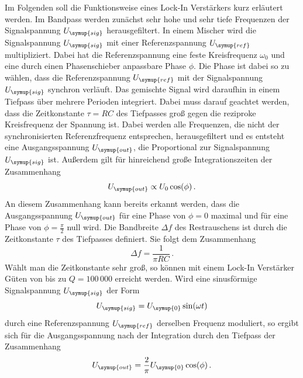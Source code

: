 Im Folgenden soll die Funktionsweise eines Lock-In Verstärkers kurz erläutert
werden. Im Bandpass werden zunächst sehr hohe und sehr tiefe Frequenzen der
Signalspannung $U_{\symup{sig}}$ herausgefiltert. In einem Mischer wird die
Signalspannung $U_{\symup{sig}}$ mit einer Referenzspannung $U_{\symup{ref}}$
multipliziert. Dabei hat die Referenzspannung eine feste Kreisfrequenz
$\omega_0$ und eine durch einen Phasenschieber anpassbare Phase $\phi$. Die Phase
ist dabei so zu wählen, dass die Referenzspannung $U_{\symup{ref}}$ mit der
Signalspannung $U_{\symup{sig}}$ synchron verläuft. Das gemischte Signal wird
daraufhin in einem Tiefpass über mehrere Perioden integriert. Dabei muss darauf
geachtet werden, dass  die Zeitkonstante $\tau=RC$ des Tiefpasses groß gegen die
reziproke Kreisfrequenz der Spannung ist. Dabei werden alle Frequenzen, die nicht
der synchronisierten Referenzfrequenz entsprechen, herausgefiltert und es entsteht
eine Ausgangsspannung $U_{\symup{out}}$, die Proportional zur Signalspannung
$U_{\symup{sig}}$ ist. Außerdem gilt für hinreichend große Integrationszeiten
der Zusammenhang
\begin{equation}
  U_{\symup{out}}\propto U_0 \cos(\phi) \,.
  \label{eqn:U_out_prop}
\end{equation}
An diesem Zusammenhang kann bereits erkannt werden, dass die Ausgangsspannung
$U_{\symup{out}}$ für eine Phase von $\phi=0$ maximal und für eine Phase von
$\phi=\frac{\pi}{2}$ null wird.
Die Bandbreite $\Delta f$ des Restrauschens ist durch die Zeitkonstante $\tau$ des Tiefpasses
definiert. Sie folgt dem Zusammenhang
\begin{equation}
  \Delta f=\frac{1}{\pi R C} \,.
  \label{eqn:bandbreite}
\end{equation}
Wählt man die Zeitkonstante sehr groß, so können mit einem Lock-In Verstärker Güten
von bis zu $Q=100 \, 000$ erreicht werden.
Wird eine sinusförmige Signalspannung $U_{\symup{sig}}$ der Form
\begin{equation}
  U_{\symup{sig}}=U_{\symup{0}}\sin(\omega t)
\end{equation}
durch eine Referenzspannung $U_{\symup{ref}}$ derselben Frequenz moduliert, so
ergibt sich für die Ausgangsspannung nach der Integration durch den Tiefpass
der Zusammenhang
\begin{equation}
  U_{\symup{out}}=\frac{2}{\pi}U_{\symup{0}}\cos(\phi)\,.
\end{equation}
